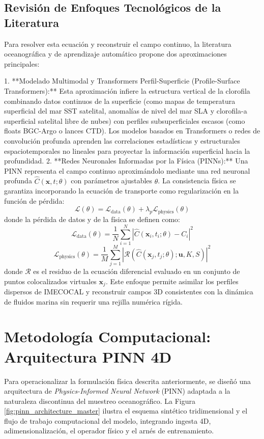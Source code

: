 \documentclass[11pt,a4paper]{article}
\begin{document}
\subsection{Revisión de Enfoques Tecnológicos de la Literatura}
Para resolver esta ecuación y reconstruir el campo continuo, la literatura oceanográfica y de aprendizaje automático propone dos aproximaciones principales:

1.  **Modelado Multimodal y Transformers Perfil-Superficie (Profile-Surface Transformers):**
    Esta aproximación infiere la estructura vertical de la clorofila combinando datos continuos de la superficie (como mapas de temperatura superficial del mar SST satelital, anomalías de nivel del mar SLA y clorofila-a superficial satelital libre de nubes) con perfiles subsuperficiales escasos (como floats BGC-Argo o lances CTD). Los modelos basados en Transformers o redes de convolución profunda aprenden las correlaciones estadísticas y estructurales espaciotemporales no lineales para proyectar la información superficial hacia la profundidad.
2.  **Redes Neuronales Informadas por la Física (PINNs):**
    Una PINN representa el campo continuo aproximándolo mediante una red neuronal profunda $\hat{C}(\mathbf{x}, t; \theta)$ con parámetros ajustables $\theta$. La consistencia física se garantiza incorporando la ecuación de transporte como regularización en la función de pérdida:
    \begin{equation}
    \mathcal{L}(\theta) = \mathcal{L}_{\text{data}}(\theta) + \lambda_p \mathcal{L}_{\text{physics}}(\theta)
    \end{equation}
    donde la pérdida de datos y de la física se definen como:
    \begin{equation}
    \mathcal{L}_{\text{data}}(\theta) = \frac{1}{N}\sum_{i=1}^N \left| \hat{C}(\mathbf{x}_i, t_i; \theta) - C_i \right|^2
    \end{equation}
    \begin{equation}
    \mathcal{L}_{\text{physics}}(\theta) = \frac{1}{M}\sum_{j=1}^M \left| \mathcal{R}\left(\hat{C}(\mathbf{x}_j, t_j; \theta); \mathbf{u}, K, S\right) \right|^2
    \end{equation}
    donde $\mathcal{R}$ es el residuo de la ecuación diferencial evaluado en un conjunto de puntos colocalizados virtuales $\mathbf{x}_j$. Este enfoque permite asimilar los perfiles dispersos de IMECOCAL y reconstruir campos 3D consistentes con la dinámica de fluidos marina sin requerir una rejilla numérica rígida.

\section{Metodología Computacional: Arquitectura PINN 4D}
Para operacionalizar la formulación física descrita anteriormente, se diseñó una arquitectura de \textit{Physics-Informed Neural Network} (PINN) adaptada a la naturaleza discontinua del muestreo oceanográfico. La Figura \ref{fig:pinn_architecture_master} ilustra el esquema sintético tridimensional y el flujo de trabajo computacional del modelo, integrando ingesta 4D, adimensionalización, el operador físico y el arnés de entrenamiento.
\end{document}
